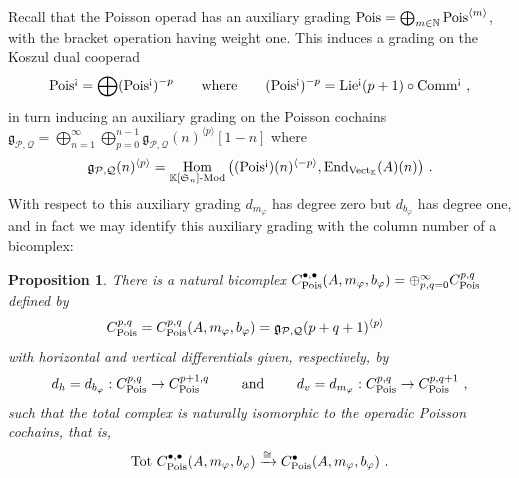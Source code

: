 \documentclass[11pt]{amsart}
\numberwithin{equation}{section}
\newtheorem{prop}[theo]{Proposition}
\theoremstyle{definition}
\newcommand{\bb}{\mathbb}
\newcommand{\mc}{\mathcal}
\newcommand{\mf}{\mathfrak}
\DeclareMathOperator{\Hom}{Hom}
\DeclareMathOperator{\Vect}{Vect}
\newcommand{\Mod}{{\textup{-Mod}}}
\newcommand{\ik}{{\bb K}}
\newcommand{\End}{{\textup{End}}}
\newcommand{\Alg}{{\textup{Alg}}}
\newcommand{\Pois}{{\textup{Pois}}}
\newcommand{\Comm}{{\textup{Comm}}}
\newcommand{\Lie}{{\textup{Lie}}}
\newcommand{\ash}{{\textup{\mbox{!`}}}}
\newcommand{\Ss}{{{\mf{S}}}}
\newcommand{\0}{{\textbf{0}}}
\newcommand{\g}{{\mf{g}}}
\def\IN{\mathbb{N}}
\def\PP{{\mc P}}
\def\QQ{{\mc Q}}
\def\gf{\mathfrak{g}}
\def \mf{\mathfrak}
\begin{document}
Recall that the Poisson operad has an auxiliary grading $\Pois = \bigoplus_{m\in\IN}{\Pois}^{\langle m\rangle}$, with the bracket operation having weight one. This induces a grading on the Koszul dual cooperad
\[
\Pois^\ash = \bigoplus (\Pois^\ash)^{-p} \qquad \text{where} \qquad (\Pois^{\ash})^{-p} = \Lie^\ash(p+1)\circ \Comm^\ash ~,
\]
in turn inducing an auxiliary grading on the Poisson cochains $\gf_{\PP, \QQ} = \bigoplus_{n=1}^\infty\bigoplus_{p=0}^{n-1} \gf_{\PP,\QQ}(n)^{\langle p\rangle}[1-n]$ where
\[
\gf_{\PP,\QQ}(n)^{\langle p \rangle} = \Hom_{\ik[\Ss_n]\Mod}\big((\Pois^\ash)(n)^{\langle-p\rangle}, \End_{\Vect_{\ik}}(A)(n)\big)~.
\]
With respect to this auxiliary grading $d_{m_{\varphi}}$ has degree zero but $d_{b_{\varphi}}$ has degree one, and in fact we may identify this auxiliary grading with the column number of a bicomplex:

\begin{prop}\label{Poisbicxprop} There is a natural bicomplex $C^{\bullet,\bullet}_\Pois(A,m_\varphi,b_\varphi)=\oplus_{p,q=0}^\infty C^{p,q}_\Pois$ defined by
\[
C^{p,q}_\Pois=C^{p,q}_\Pois(A,m_\varphi,b_\varphi)= \g_{\mc P, \mc Q}(p+q+1)^{\langle p \rangle } \qquad  
\]
with horizontal and vertical differentials given, respectively, by
\[
d_h=d_{b_\varphi}:C^{p,q}_\Pois \to C^{p+1,q}_\Pois \qquad \text{ and } \qquad d_v=d_{m_\varphi}:C^{p,q}_\Pois \to C^{p,q+1}_\Pois~,
\]
such that the total complex is naturally isomorphic to the operadic Poisson cochains, that is, \[\textup{Tot } C^{\bullet,\bullet}_\Pois(A,m_\varphi,b_\varphi) \xrightarrow{\cong} C_\Pois^\bullet(A,m_\varphi,b_\varphi) \ .\]
\end{prop}
\end{document}
